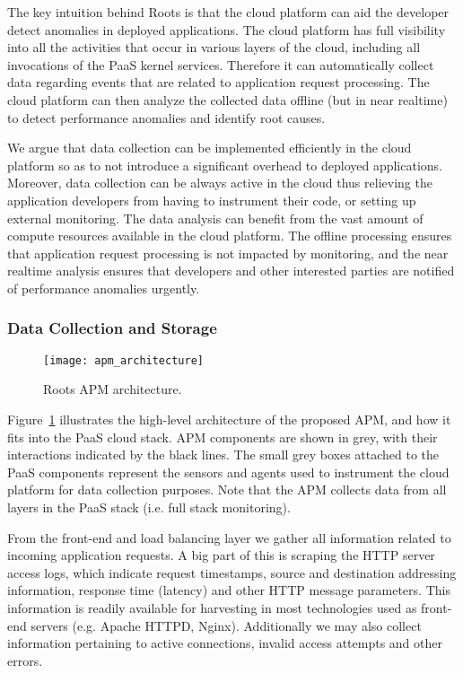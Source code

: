 The key intuition behind Roots is that
the cloud platform can aid the developer detect anomalies in deployed applications.
The cloud platform has full visibility into all the activities that occur in various layers of the cloud,
including all invocations of the PaaS kernel services. Therefore
it can automatically collect data regarding events that are related to application request processing. 
The cloud platform can then analyze the collected data offline (but in near realtime) to detect 
performance anomalies and identify root causes.

We argue that data collection can be implemented efficiently in the cloud platform so as to not
introduce a significant overhead to deployed applications.
Moreover, data collection can be always active in the cloud thus relieving the application developers
from having to instrument their code, or setting up external monitoring.
The data analysis can benefit from the vast amount of compute
resources available in the cloud platform. The offline processing ensures that application request
processing is not impacted by monitoring, and the near realtime analysis ensures that developers
and other interested parties are notified of performance anomalies urgently. 

\subsubsection{Data Collection and Storage}
\begin{figure}
\centering
\texttt{[image: apm\_architecture]}
\caption{Roots APM architecture.}
\label{fig:apm_architecture}
\end{figure}

Figure~\ref{fig:apm_architecture} illustrates the high-level architecture of the proposed APM, and how 
it fits into the PaaS cloud stack. APM components are shown in grey, with their interactions indicated
by the black lines. The small grey boxes attached to the PaaS components represent the sensors and
agents used to instrument the cloud platform for data collection purposes. Note that the APM collects
data from all layers in the PaaS stack (i.e. full stack monitoring).

From the front-end and load balancing layer we gather all information related to incoming application
requests. A big part of this is scraping the HTTP server access logs, which indicate request timestamps,
source and destination addressing information, response time (latency) and other HTTP message
parameters. This information is readily available for harvesting in most technologies used as front-end
servers (e.g. Apache HTTPD, Nginx). Additionally we may also collect information pertaining to active
connections, invalid access attempts and other errors.

